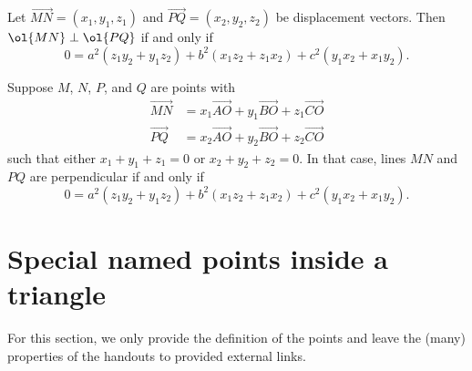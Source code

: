 \documentclass[11pt]{scrartcl}
\begin{document}
\begin{theorem}
  Let $\overrightarrow{MN} = (x_1, y_1, z_1)$
  and $\overrightarrow{PQ} = (x_2, y_2, z_2)$ be displacement vectors.
  Then $\ol{MN} \perp \ol{PQ}$ if and only if
  \[  0 = a^2(z_1y_2 + y_1z_2) + b^2(x_1z_2 + z_1x_2) + c^2(y_1x_2 + x_1y_2). \]
\end{theorem}

\begin{theorem}
  Suppose $M$, $N$, $P$, and $Q$ are points with
  \begin{align*}
    \overrightarrow{MN} &= x_1 \overrightarrow{AO} + y_1 \overrightarrow{BO} + z_1 \overrightarrow{CO} \\
    \overrightarrow{PQ} &= x_2 \overrightarrow{AO} + y_2 \overrightarrow{BO} + z_2 \overrightarrow{CO}
  \end{align*}
  such that either $x_1+y_1+z_1=0$ or $x_2+y_2+z_2=0$.
  In that case, lines $MN$ and $PQ$ are perpendicular if and only if
  \[ 0 = a^2(z_1y_2 + y_1z_2) + b^2(x_1z_2 + z_1x_2) + c^2(y_1x_2 + x_1y_2). \]
\end{theorem}


\section{Special named points inside a triangle}
For this section, we only provide the definition of the points
and leave the (many) properties of the handouts to provided external links.
\end{document}
